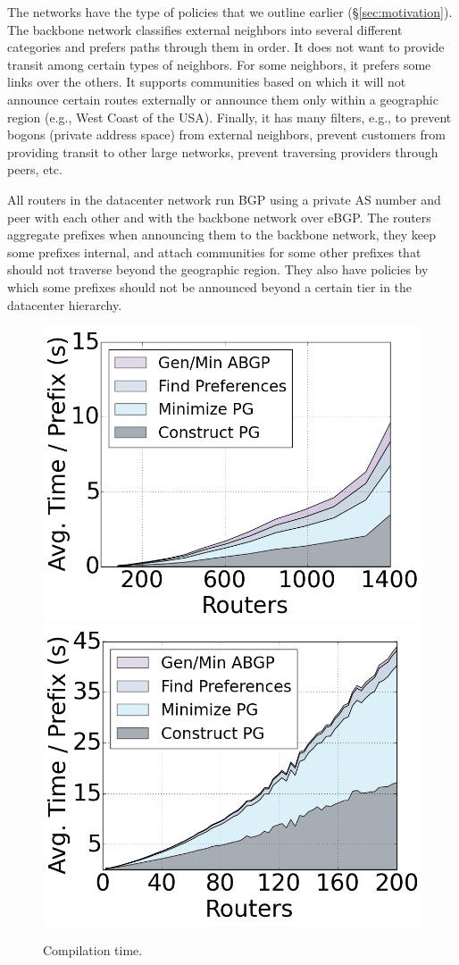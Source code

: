 \documentclass[10pt]{sigalternate052015}
\begin{document}
The networks have the type of policies that we outline earlier (\S\ref{sec:motivation}). The backbone network classifies external neighbors into several different categories and prefers paths through them in order. It does not want to provide transit among certain types of neighbors. For some neighbors, it prefers some links over the others. It supports communities based on which it will not announce certain routes externally or announce them only within a geographic region (e.g., West Coast of the USA). Finally, it has many filters, e.g., to prevent bogons (private address space) from external neighbors, prevent customers from providing transit to other large networks, prevent traversing providers through peers, etc.

All routers in the datacenter network run BGP using a private AS number and peer with each other and with the backbone network over eBGP. The routers aggregate prefixes when announcing them to the backbone network, they keep some prefixes internal, and attach communities for some other prefixes that should not traverse beyond the geographic region. They also have policies by which some prefixes should not be announced beyond a certain tier in the datacenter hierarchy.

\begin{figure}
    {\includegraphics[width=.49\columnwidth]{figures/compilation-times-dc.png}}
    {\includegraphics[width=.49\columnwidth]{figures/compilation-times-backbone.png}} \\
  \caption{Compilation time. \label{fig:compilation-times}}
  \vspace{-1em}
\end{figure}
\end{document}
